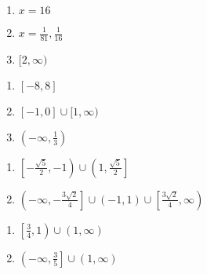 \documentclass{ximera}
\begin{document}
\begin{multicols}{3}
\begin{enumerate}
\setcounter{enumi}{\value{HW}}

\item $x=16$ 
\item  $x = \frac{1}{81}, \frac{1}{16}$
\item  $[2, \infty)$   


\setcounter{HW}{\value{enumi}}
\end{enumerate}
\end{multicols}

\begin{multicols}{3}
\begin{enumerate}
\setcounter{enumi}{\value{HW}}

\item  $[-8,8]$    
\item  $[-1, 0] \cup [1, \infty)$  
\item $\left(-\infty, \frac{1}{3} \right)$

\setcounter{HW}{\value{enumi}}
\end{enumerate}
\end{multicols}

\begin{multicols}{2}
\begin{enumerate}
\setcounter{enumi}{\value{HW}}

\item $\left[ -\frac{\sqrt{5}}{2}, -1\right) \cup \left(1, \frac{\sqrt{5}}{2}\right]$
\item  $\left(-\infty, -\frac{3\sqrt{2}}{4} \right] \cup (-1,1) \cup \left[ \frac{3\sqrt{2}}{4}, \infty \right)$

\setcounter{HW}{\value{enumi}}
\end{enumerate}
\end{multicols}

\begin{multicols}{2}
\begin{enumerate}
\setcounter{enumi}{\value{HW}}


\item   $\left[ \frac{3}{4}, 1\right) \cup (1, \infty)$

\item $\left( -\infty, \frac{3}{5} \right] \cup (1, \infty)$

\setcounter{HW}{\value{enumi}}
\end{enumerate}
\end{multicols}
\end{document}
